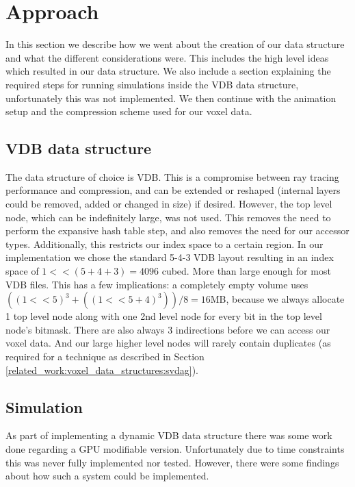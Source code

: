 \section{Approach} \label{approach}
In this section we describe how we went about the creation of our data structure and what the different considerations were. This includes the high level ideas which resulted in our data structure. We also include a section explaining the required steps for running simulations inside the VDB data structure, unfortunately this was not implemented. We then continue with the animation setup and the compression scheme used for our voxel data.




\subsection{VDB data structure} \label{approach:vdb_data_structure}
The data structure of choice is VDB. This is a compromise between ray tracing performance and compression, and can be extended or reshaped (internal layers could be removed, added or changed in size) if desired. However, the top level node, which can be indefinitely large, was not used. This removes the need to perform the expansive hash table step, and also removes the need for our accessor types. Additionally, this restricts our index space to a certain region. In our implementation we chose the standard 5-4-3 VDB layout resulting in an index space of $1 << (5+4+3) = 4096$ cubed. More than large enough for most VDB files. This has a few implications: a completely empty volume uses $((1<<5)^3+((1<<5+4)^3)) / 8 = 16$MB, because we always allocate 1 top level node along with one 2nd level node for every bit in the top level node's bitmask. There are also always 3 indirections before we can access our voxel data. And our large higher level nodes will rarely contain duplicates (as required for a technique as described in Section \ref{related_work:voxel_data_structures:svdag}).

\subsection{Simulation} \label{approach:simulation}
As part of implementing a dynamic VDB data structure there was some work done regarding a GPU modifiable version. Unfortunately due to time constraints this was never fully implemented nor tested. However, there were some findings about how such a system could be implemented.

